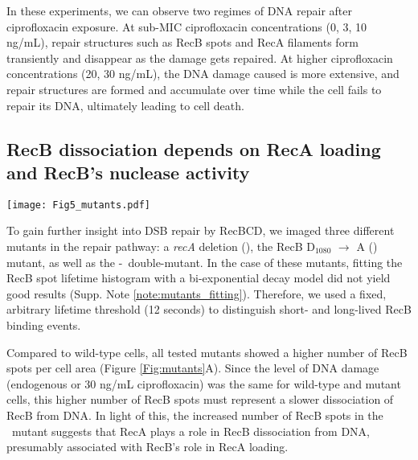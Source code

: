 In these experiments, we can observe two regimes of DNA repair after ciprofloxacin exposure. At sub-MIC ciprofloxacin concentrations (0, 3, 10 ng/mL), repair structures such as RecB spots and RecA filaments form transiently and disappear as the damage gets repaired. At higher ciprofloxacin concentrations (20, 30 ng/mL), the DNA damage caused is more extensive, and repair structures are formed and accumulate over time while the cell fails to repair its DNA, ultimately leading to cell death.


\subsection*{RecB dissociation depends on RecA loading and RecB's nuclease activity}

\begin{figure*}[htbp]
\begin{center}
\texttt{[image: Fig5\_mutants.pdf]}
\end{center}
\caption{}
\label{Fig:mutants}
\end{figure*}

To gain further insight into DSB repair by RecBCD, we imaged three different mutants in the repair pathway: a \textit{recA} deletion (\dreca), the RecB D$_{1080}$ $\rightarrow$ A (\teneighty) mutant, as well as the \dreca-\teneighty\ double-mutant. In the case of these mutants, fitting the RecB spot lifetime histogram with a bi-exponential decay model did not yield good results (Supp. Note \ref{note:mutants_fitting}). Therefore, we used a fixed, arbitrary lifetime threshold (12 seconds) to distinguish short- and long-lived RecB binding events.

Compared to wild-type cells, all tested mutants showed a higher number of RecB spots per cell area (Figure \ref{Fig:mutants}A). Since the level of DNA damage (endogenous or 30 ng/mL ciprofloxacin) was the same for wild-type and mutant cells, this higher number of RecB spots must represent a slower dissociation of RecB from DNA. In light of this, the increased number of RecB spots in the \dreca\ mutant suggests that RecA plays a role in RecB dissociation from DNA, presumably associated with RecB's role in RecA loading.

